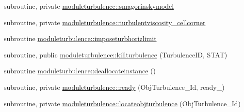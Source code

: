 \begin{DoxyCompactItemize}
\item 
subroutine, private \mbox{\hyperlink{namespacemoduleturbulence_a80e74aea32fd0cd9fd8e273cb359791a}{moduleturbulence\+::smagorinskymodel}}
\item 
subroutine, private \mbox{\hyperlink{namespacemoduleturbulence_ab7894e5b2120544a23a97a5dec146823}{moduleturbulence\+::turbulentviscosity\+\_\+cellcorner}}
\item 
subroutine \mbox{\hyperlink{namespacemoduleturbulence_a350c5c3bf3571f6247e3278025c35a0c}{moduleturbulence\+::imposeturbhorizlimit}}
\item 
subroutine, public \mbox{\hyperlink{namespacemoduleturbulence_a16fdef89832180a7e41d6bd450c05746}{moduleturbulence\+::killturbulence}} (Turbulence\+ID, S\+T\+AT)
\item 
subroutine \mbox{\hyperlink{namespacemoduleturbulence_aad40d3e2593854d66c21ebbd92791ba0}{moduleturbulence\+::deallocateinstance}} ()
\item 
subroutine, private \mbox{\hyperlink{namespacemoduleturbulence_aee156286cd0fad2976b9e8c3c1d52ec6}{moduleturbulence\+::ready}} (Obj\+Turbulence\+\_\+\+Id, ready\+\_\+)
\item 
subroutine, private \mbox{\hyperlink{namespacemoduleturbulence_a36b249a1813247cecf28481893bc0ea2}{moduleturbulence\+::locateobjturbulence}} (Obj\+Turbulence\+\_\+\+Id)
\end{DoxyCompactItemize}
